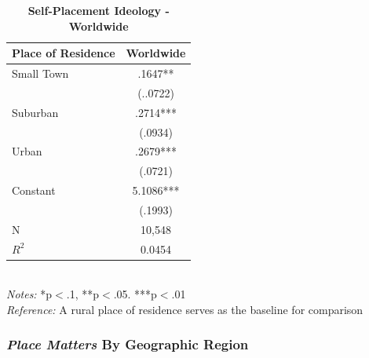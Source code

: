 \documentclass[12pt, titlepage]{article}
\newcommand\e{\emph}
\newcommand\tb{\textbf}
\begin{document}
\begin{singlespace}
	\begin{table}[H]
		\centering
		\caption{\tb{Self-Placement Ideology - Worldwide}}
		\begin{tabulary}{\linewidth}{l c}
			\\
			\hline
			\tb{Place of Residence}&\tb{Worldwide} \\
			\hline
			Small Town&.1647**  \\    
			& (..0722)   \\
			Suburban & .2714***\\ 
			& (.0934) \\
			Urban   & .2679***   \\
			& (.0721)    \\
			Constant   & 5.1086***  \\
			&(.1993) \\
			N  & 10,548  \\
			$R^2$	& 0.0454 \\
			\hline                                       
		\end{tabulary}
		\\
		\e{Notes:} *p$<$.1, **p$<$.05. ***p$<$.01 \\
		\e{Reference:} A rural place of residence serves as the baseline for comparison
		\label{table3}
	\end{table}
\end{singlespace}

\subsubsection{\e{Place Matters} By Geographic Region}
\end{document}

